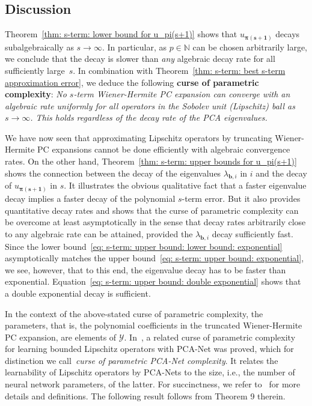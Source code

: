 \documentclass[namedate,webpdf]{ima-authoring-template-blank}
\numberwithin{counter}{section}
\numberwithin{equation}{section}
\theoremstyle{plain}
\theoremstyle{definition}
\newcommand*{\cY}{\mathcal{Y}}
\newcommand*{\bbN}{\mathbb{N}}
\theoremstyle{thmstyletwo}
\begin{document}
\subsection{Discussion}
\label{subsec: s-term: discussion}

Theorem~\ref{thm: s-term: lower bound for u_pi(s+1)} shows that \(u_{\bm{\pi(s + 1)}}\) decays subalgebraically as \(s \to \infty\). In particular, as \(p \in \bbN\) can be chosen arbitrarily large, we conclude that the decay is slower than \emph{any} algebraic decay rate for all sufficiently large~\(s\). In combination with Theorem~\ref{thm: s-term: best s-term approximation error}, we deduce the following \textbf{curse of parametric complexity}: \emph{No \(s\)-term Wiener-Hermite PC expansion can converge with an algebraic rate uniformly for all operators in the Sobolev unit (Lipschitz) ball as \(s \to \infty\). This holds regardless of the decay rate of the PCA eigenvalues.}

We have now seen that approximating Lipschitz operators by truncating Wiener-Hermite PC expansions cannot be done efficiently with algebraic convergence rates. 
On the other hand, Theorem~\ref{thm: s-term: upper bounds for u_pi(s+1)} shows the connection between the decay of the eigenvalues \(\lambda_{\bm{b}, i}\) in \(i\) and the decay of \(u_{\bm{\pi(s + 1)}}\) in \(s\). It illustrates the obvious qualitative fact that a faster eigenvalue decay implies a faster decay of the polynomial \(s\)-term error. But it also provides quantitative decay rates and shows that the curse of parametric complexity can be overcome at least asymptotically in the sense that decay rates arbitrarily close to any algebraic rate can be attained, provided the \(\lambda_{\bm{b}, i}\) decay sufficiently fast. Since the lower bound~\eqref{eq: s-term: upper bound: lower bound: exponential} asymptotically matches the upper bound~\eqref{eq: s-term: upper bound: exponential}, we see, however, that to this end, the eigenvalue decay has to be faster than exponential. Equation~\eqref{eq: s-term: upper bound: double exponential} shows that a double exponential decay is sufficient.


In the context of the above-stated curse of parametric complexity, the parameters, that is, the polynomial coefficients in the truncated Wiener-Hermite PC expansion, are elements of \(\cY\). In~\citet{lanthaler_OperatorLearningPCANetUpper_2023}, a related curse of parametric complexity for learning bounded Lipschitz operators with PCA-Net was proved, which for distinction we call~\emph{curse of parametric PCA-Net complexity}. It relates the learnability of Lipschitz operators by PCA-Nets to the size, i.e., the number of neural network parameters, of the latter. For succinctness, we refer to~\citet{lanthaler_OperatorLearningPCANetUpper_2023} for more details and definitions. The following result follows from Theorem 9 therein.
\end{document}
